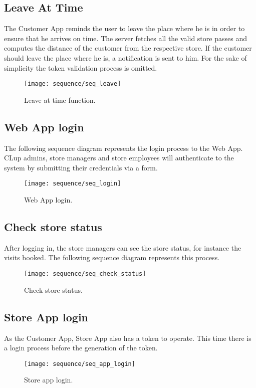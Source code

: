 \clearpage
\subsection{Leave At Time}
The Customer App reminds the user to leave the place where he is in order to ensure that he arrives on time.\newline
The server fetches all the valid store passes and computes the distance of the customer from the respective store. If the customer should leave the place where he is, a notification is sent to him. For the sake of simplicity the token validation process is omitted.
\begin{figure}[H]
	\centering
	\texttt{[image: sequence/seq\_leave]}
	\caption{Leave at time function.}
	\label{fig:seq_leave}
\end{figure}

\subsection{Web App login}
The following sequence diagram represents the login process to the Web App. CLup admins, store managers and store employees will authenticate to the system by submitting their credentials via a form.
\begin{figure}[H]
	\centering
	\texttt{[image: sequence/seq\_login]}
	\caption{Web App login.}
	\label{fig:seq_login}
\end{figure}

\subsection{Check store status}
After logging in, the store managers can see the store status, for instance the visits booked. The following sequence diagram represents this process. 
\begin{figure}[H]
	\centering
	\texttt{[image: sequence/seq\_check\_status]}
	\caption{Check store status.}
	\label{fig:seq_check_status}
\end{figure}

\subsection{Store App login}
As the Customer App, Store App also has a token to operate. This time there is a login process before the generation of the token.
\begin{figure}[H]
	\centering
	\texttt{[image: sequence/seq\_app\_login]}
	\caption{Store app login.}
	\label{fig:seq_app_login}
\end{figure}

